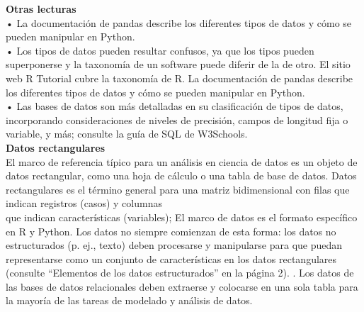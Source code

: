 \documentclass[ebook,12pt,oneside,openany]{memoir}
\begin{document}
\setlength{\parindent}{0pt}\textbf{Otras lecturas}\\
• La documentación de pandas describe los diferentes tipos de datos y cómo se pueden manipular en Python.\\
• Los tipos de datos pueden resultar confusos, ya que los tipos pueden superponerse y la taxonomía de un software puede diferir de la de otro. El sitio web R Tutorial cubre la taxonomía de R. La documentación de pandas describe los diferentes tipos de datos y cómo se pueden manipular en Python.\\
• Las bases de datos son más detalladas en su clasificación de tipos de datos, incorporando consideraciones de niveles de precisión, campos de longitud fija o variable, y más; consulte la guía de SQL de W3Schools.\\

\setlength{\parindent}{0pt}\textbf{Datos rectangulares}\\
El marco de referencia típico para un análisis en ciencia de datos es un objeto de datos rectangular, como una hoja de cálculo o una tabla de base de datos.
Datos rectangulares es el término general para una matriz bidimensional con filas que indican registros (casos) y columnas\\ que indican características (variables); El marco de datos es el formato específico en R y Python. Los datos no siempre comienzan de esta forma: los datos no estructurados (p. ej., texto) deben procesarse y manipularse para que puedan representarse como un conjunto de características en los datos rectangulares (consulte “Elementos de los datos estructurados” en la página 2). .
Los datos de las bases de datos relacionales deben extraerse y colocarse en una sola tabla para la mayoría de las tareas de modelado y análisis de datos.\\
\end{document}
